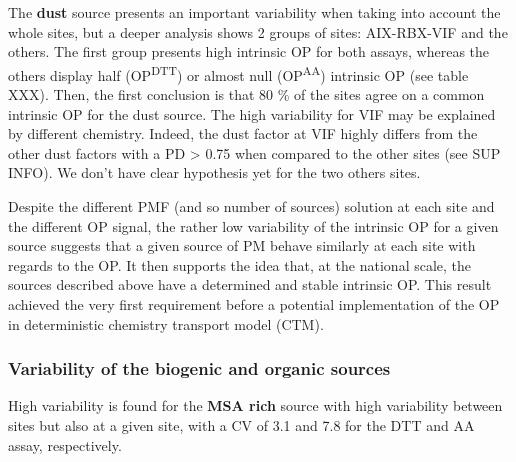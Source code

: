 \documentclass[
]{article}
\begin{document}
The \textbf{dust} source presents an important variability when taking
into account the whole sites, but a deeper analysis shows 2 groups of
sites: AIX-RBX-VIF and the others. The first group presents high
intrinsic OP for both assays, whereas the others display half
(OP\textsuperscript{DTT}) or almost null (OP\textsuperscript{AA})
intrinsic OP (see table XXX). Then, the first conclusion is that 80 \%
of the sites agree on a common intrinsic OP for the dust source. The
high variability for VIF may be explained by different chemistry.
Indeed, the dust factor at VIF highly differs from the other dust
factors with a PD \textgreater{} 0.75 when compared to the other sites
(see SUP INFO). We don't have clear hypothesis yet for the two others
sites.

Despite the different PMF (and so number of sources) solution at each
site and the different OP signal, the rather low variability of the
intrinsic OP for a given source suggests that a given source of PM
behave similarly at each site with regards to the OP. It then supports
the idea that, at the national scale, the sources described above have a
determined and stable intrinsic OP. This result achieved the very first
requirement before a potential implementation of the OP in deterministic
chemistry transport model (CTM).

\hypertarget{variability-of-the-biogenic-and-organic-sources}{%
\subsubsection{Variability of the biogenic and organic
sources}\label{variability-of-the-biogenic-and-organic-sources}}

High variability is found for the \textbf{MSA rich} source with high
variability between sites but also at a given site, with a CV of 3.1 and
7.8 for the DTT and AA assay, respectively.
\end{document}

